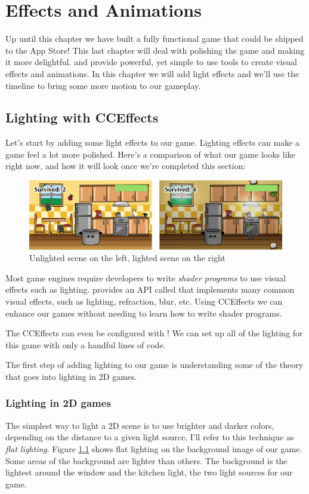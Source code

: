 \chapter{Effects and Animations}

Up until this chapter we have built a fully functional game that could be
shipped to the App Store! This last chapter will deal with polishing the game and making
it more delightful. \SB{} and \cocos{} provide powerful, yet simple to use tools
to create visual effects and animations. In this chapter we will add light
effects and we'll use the \SB{} timeline to bring some more motion to our
gameplay.

\section{Lighting with CCEffects}
Let's start by adding some light effects to our game. Lighting effects can make
a game feel a lot more polished. Here's a comparison of what our game looks like
right now, and how it will look once we're completed this section:

\begin{figure}[H]
    \centering
    \includegraphics[width=0.9\linewidth]{images/Chapter9/lighting_comparison.png}
    \caption{Unlighted scene on the left, lighted scene on the right}
    \label{lighting_example}
\end{figure}

Most game engines require developers to write \textit{shader programs} to
use visual effects such as lighting. \cocos{} provides an API called
 that implements many common visual effects, such as
lighting, refraction, blur, etc. Using CCEffects we can enhance our games
without needing to learn how to write shader programs. 

The CCEffects can even be configured with \SB{}! We can set up all of the
lighting for this game with only a handful lines of code. 

The first step of adding lighting to our game is understanding some of the
theory that goes into lighting in 2D games.

\subsection{Lighting in 2D games}
The simplest way to light a 2D scene is to use brighter and darker colors,
depending on the distance to a given light source, I'll refer to this technique
as \textit{flat lighting}. Figure \ref{lighting_example} shows flat lighting on
the background image of our game. Some areas of the background are lighter than
others. The background is the lightest around the window and the kitchen light,
the two light sources for our game.

